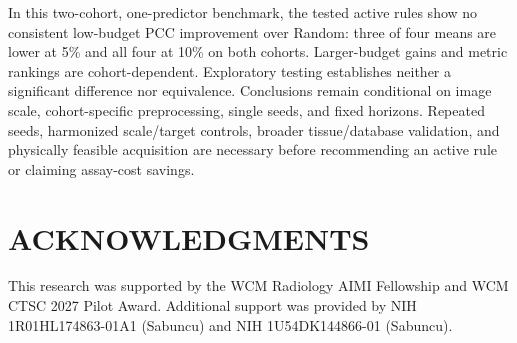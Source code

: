 In this two-cohort, one-predictor benchmark, the tested active rules show no consistent low-budget PCC improvement over Random: three of four means are lower at 5\% and all four at 10\% on both cohorts. Larger-budget gains and metric rankings are cohort-dependent. Exploratory testing establishes neither a significant difference nor equivalence. Conclusions remain conditional on image scale, cohort-specific preprocessing, single seeds, and fixed horizons. Repeated seeds, harmonized scale/target controls, broader tissue/database validation, and physically feasible acquisition are necessary before recommending an active rule or claiming assay-cost savings.

\section*{ACKNOWLEDGMENTS}
This research was supported by the WCM Radiology AIMI Fellowship and WCM CTSC 2027 Pilot Award. Additional support was provided by NIH 1R01HL174863-01A1 (Sabuncu) and NIH 1U54DK144866-01 (Sabuncu).




